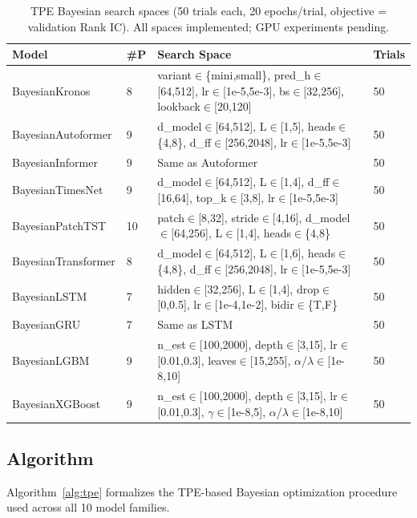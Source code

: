 \documentclass[sigconf,10pt]{acmart}
\begin{document}
\begin{table}[htbp]
\centering
\caption{TPE Bayesian search spaces (50 trials each, 20 epochs/trial, objective = validation Rank IC). All spaces implemented; GPU experiments pending.}
\label{tab:bayesian}
\footnotesize
\begin{tabular}{@{}llp{6.5cm}l@{}}
\toprule
\textbf{Model} & \textbf{\#P} & \textbf{Search Space} & \textbf{Trials} \\
\midrule
BayesianKronos & 8 & variant$\in$\{mini,small\}, pred\_h$\in$[64,512], lr$\in$[1e-5,5e-3], bs$\in$[32,256], lookback$\in$[20,120] & 50 \\
BayesianAutoformer & 9 & d\_model$\in$[64,512], L$\in$[1,5], heads$\in$\{4,8\}, d\_ff$\in$[256,2048], lr$\in$[1e-5,5e-3] & 50 \\
BayesianInformer & 9 & Same as Autoformer & 50 \\
BayesianTimesNet & 9 & d\_model$\in$[64,512], L$\in$[1,4], d\_ff$\in$[16,64], top\_k$\in$[3,8], lr$\in$[1e-5,5e-3] & 50 \\
BayesianPatchTST & 10 & patch$\in$[8,32], stride$\in$[4,16], d\_model$\in$[64,256], L$\in$[1,4], heads$\in$\{4,8\} & 50 \\
BayesianTransformer & 8 & d\_model$\in$[64,512], L$\in$[1,6], heads$\in$\{4,8\}, d\_ff$\in$[256,2048], lr$\in$[1e-5,5e-3] & 50 \\
BayesianLSTM & 7 & hidden$\in$[32,256], L$\in$[1,4], drop$\in$[0,0.5], lr$\in$[1e-4,1e-2], bidir$\in$\{T,F\} & 50 \\
BayesianGRU & 7 & Same as LSTM & 50 \\
BayesianLGBM & 9 & n\_est$\in$[100,2000], depth$\in$[3,15], lr$\in$[0.01,0.3], leaves$\in$[15,255], $\alpha$/$\lambda$$\in$[1e-8,10] & 50 \\
BayesianXGBoost & 9 & n\_est$\in$[100,2000], depth$\in$[3,15], lr$\in$[0.01,0.3], $\gamma$$\in$[1e-8,5], $\alpha$/$\lambda$$\in$[1e-8,10] & 50 \\
\bottomrule
\end{tabular}
\end{table}

\subsection{Algorithm}

Algorithm~\ref{alg:tpe} formalizes the TPE-based Bayesian optimization procedure used across all 10 model families.
\end{document}
